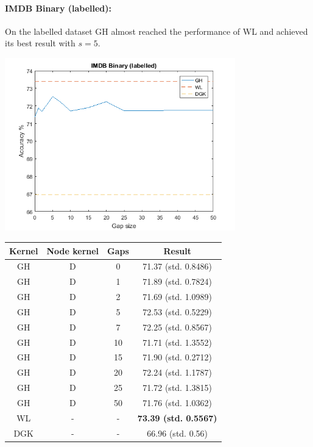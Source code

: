\documentclass{article}
\begin{document}
\paragraph{IMDB Binary (labelled):}
On the labelled dataset GH almost reached the performance of WL and achieved its best result with $s=5$. \\
\begin{minipage}{0.6\linewidth}
	\hspace*{-1in}
	\includegraphics[width=10cm]{imdb_labelled}
	\label{fig:imdb_labelled}
\end{minipage}
\begin{minipage}[c]{0.5\linewidth}	
	\centering
	\begin{tabular}{c|c|c|c}
		Kernel & Node kernel & Gaps & Result\\
		\hline
		GH & D & 0 & 71.37 (std. 0.8486)\\
		GH & D & 1 & 71.89 (std. 0.7824)\\
		GH & D & 2 & 71.69 (std. 1.0989)\\
		GH & D & 5 & 72.53 (std. 0.5229)\\
		GH & D & 7 & 72.25 (std. 0.8567)\\
		GH & D & 10 & 71.71 (std. 1.3552)\\
		GH & D & 15 & 71.90 (std. 0.2712)\\
		GH & D & 20 & 72.24 (std. 1.1787)\\
		GH & D & 25 & 71.72 (std. 1.3815)\\
		GH & D & 50 & 71.76 (std. 1.0362)\\
		WL & - & - & \textbf{73.39 (std. 0.5567)} \\
		DGK\cite{yanardag} & - & - & 66.96 (std. 0.56)\\
	\end{tabular}
	\label{table:imdb_labelled}
\end{minipage}
\end{document}
